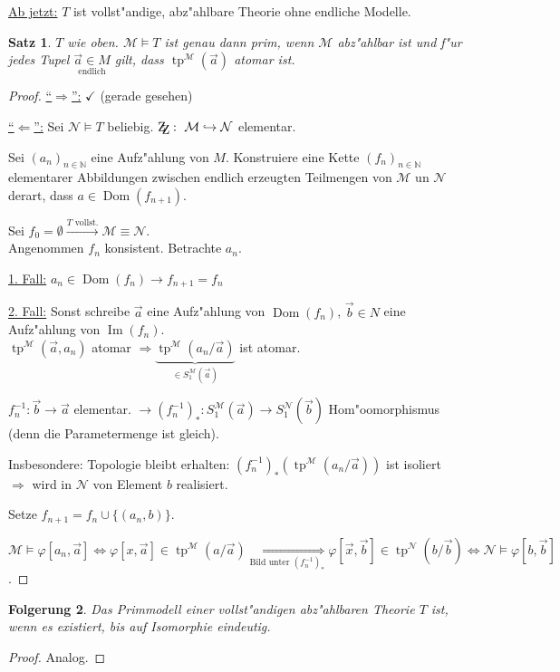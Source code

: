\documentclass[a4paper,12pt,numbers=noenddot,parskip=full]{scrartcl}
\newcommand{\setN}{\mathbb{N}}
\newcommand{\scrM}{\mathcal{M}}
\newcommand{\scrN}{\mathcal{N}}
\newcommand{\zz}{\mathrm{Z\kern-.3em\raise-0.5ex\hbox{Z}}:~}
\newcommand{\heading}{\underline}
\DeclareMathOperator{\im}{Im}
\DeclareMathOperator{\dom}{Dom}
\DeclareMathOperator{\typ}{tp}
\theoremstyle{dotless}
\newtheorem{theorem}{Satz}[section]
\newtheorem{corollary}[theorem]{Folgerung}
\begin{document}
\heading{Ab jetzt:} $T$ ist vollst"andige, abz"ahlbare Theorie ohne endliche Modelle.
\begin{theorem}
	$T$ wie oben. $\scrM \models T$ ist genau dann prim, wenn $\scrM$ abz"ahlbar ist und f"ur jedes Tupel $\underset{\text{endlich}}{\vec{a}\in M}$ gilt, dass $\typ^\scrM (\vec{a})$ atomar ist.
\end{theorem}
\begin{proof}
	\underline{"`$\Rightarrow$"':} $\checkmark$ (gerade gesehen)
	
	\underline{"`$\Leftarrow$"':} Sei $\scrN \models T$ beliebig. $\zz \scrM \hookrightarrow \scrN$ elementar.
	
	Sei $(a_n)_{n \in \setN}$ eine Aufz"ahlung von $M$. Konstruiere eine Kette $(f_n)_{n \in \setN}$ elementarer Abbildungen zwischen endlich erzeugten Teilmengen von $\scrM$ un $\scrN$ derart, dass $a \in \dom(f_{n+1})$.
	
	Sei $f_0 = \emptyset \overset{T\text{ vollst.}}{\longrightarrow} \scrM \equiv \scrN$.\\
	Angenommen $f_n$ konsistent. Betrachte \underline{$a_n$}.
	
	\underline{1. Fall:} $a_n \in \dom(f_n) \rightarrow f_{n+1} = f_n$
	
	\underline{2. Fall:} Sonst schreibe $\vec{a}$ eine Aufz"ahlung von $\dom(f_n)$, $\vec{b} \in N$ eine Aufz"ahlung von $\im(f_n)$.\\
	$\typ^\scrM(\vec{a}, a_n)$ atomar $\Longrightarrow \underbrace{\typ^\scrM(a_n/\vec{a})}_{\in S_1^\scrM(\vec{a})}$ ist atomar.
	
	$f_n^{-1}: \vec{b} \longrightarrow \vec{a}$ elementar. $\rightarrow (f_n^{-1})_* : S_1^\scrM(\vec{a}) \longrightarrow S_1^\scrN(\vec{b})$ Hom"oomorphismus (denn die Parametermenge ist gleich).
	
	Insbesondere: Topologie bleibt erhalten: $(f_n^{-1})_*(\typ^\scrM(a_n/\vec{a}))$ ist isoliert $\Rightarrow$ wird in $\scrN$ von Element $b$ realisiert.
	
	Setze $f_{n+1} = f_n \cup \{(a_n, b) \}$.
	
	$\scrM \models \varphi[a_n, \vec{a}] \Leftrightarrow \varphi[x, \vec{a}] \in \typ^\scrM(a/\vec{a}) \underset{\text{Bild unter } (f_n^{-1})_*}{\Longleftrightarrow} \varphi[\vec{x}, \vec{b}] \in \typ^\scrN (b/\vec{b}) \Leftrightarrow \scrN \models \varphi[b, \vec{b}]$.
\end{proof}
\begin{corollary}
	Das Primmodell einer vollst"andigen abz"ahlbaren Theorie $T$ ist, wenn es existiert, bis auf Isomorphie eindeutig.
\end{corollary}
\begin{proof}
	Analog.
\end{proof}
\end{document}
